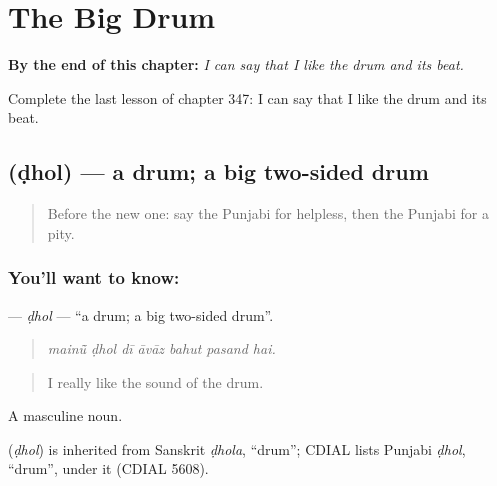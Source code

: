 
\chapter{The Big Drum}
\label{ch:pa-a2-the-big-drum}

\begin{chapteropening}
\textbf{By the end of this chapter:} \emph{I can say that I like the drum and its beat.}

Complete the last lesson of chapter 347: I can say that I like the drum and its beat.
\end{chapteropening}

\section[\texorpdfstring{\pa{ਢੋਲ} (ḍhol)}{ਢੋਲ (ḍhol)}]{ (ḍhol) — a drum; a big two-sided drum}

\label{lesson:PA-C347-dhol}



\begin{quote}
Before the new one: say the Punjabi for helpless, then the Punjabi for a pity.
\end{quote}

\subsection*{You'll want to know: }
\textbf{} — \emph{ḍhol} — \textquotedblleft{}a drum; a big two-sided drum\textquotedblright{}.

\begin{quote}
      
\end{quote}

\begin{quote}
\emph{mainū̃ ḍhol dī āvāz bahut pasand hai.}
\end{quote}

\begin{quote}
I really like the sound of the drum.
\end{quote}

A masculine noun.

\begin{cousinweb}
\textbf{} (\emph{ḍhol}) is inherited from Sanskrit \emph{ḍhola}, \textquotedblleft{}drum\textquotedblright{}; CDIAL lists Punjabi \emph{ḍhol}, \textquotedblleft{}drum\textquotedblright{}, under it (CDIAL 5608).
\end{cousinweb}

